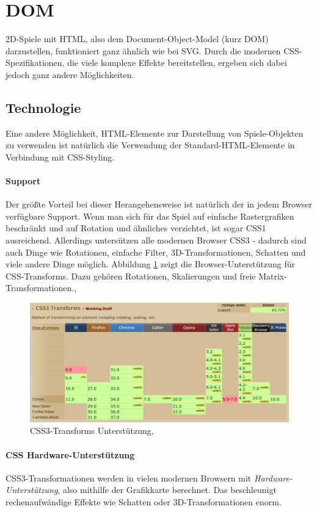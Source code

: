 \documentclass[a4paper, 12pt]{article}
\begin{document}
\section{DOM}
2D-Spiele mit HTML, also dem Document-Object-Model (kurz DOM) darzustellen, funktioniert ganz ähnlich wie bei SVG. Durch die modernen CSS-Spezifikationen, die viele komplexe Effekte bereitstellen, ergeben sich dabei jedoch ganz andere Möglichkeiten.
\subsection{Technologie}
Eine andere Möglichkeit, HTML-Elemente zur Darstellung von Spiele-Objekten zu verwenden ist natürlich die Verwendung der Standard-HTML-Elemente in Verbindung mit CSS-Styling.
\paragraph{Support} Der größte Vorteil bei dieser Herangehensweise ist natürlich der in jedem Browser verfügbare Support. Wenn man sich für das Spiel auf einfache Rastergrafiken beschränkt und auf Rotation und ähnliches verzichtet, ist sogar CSS1 ausreichend. Allerdings untersützen alle modernen Browser CSS3 - dadurch sind auch Dinge wie Rotationen, einfache Filter, 3D-Transformationen, Schatten und viele andere Dinge möglich. Abbildung \ref{css_transforms_support} zeigt die Browser-Unterstützung für CSS-Transforms. Dazu gehören Rotationen, Skalierungen und freie Matrix-Transformationen.\cite{CSS3_1},\cite{CSS3_2}
\begin{figure}[H]
	\begin{center}
		\includegraphics[width=\textwidth]{assets/css_transforms_support.png} 
	\end{center}
	\caption{CSS3-Transforms Unterstützung, \cite{CanIUseCSS3}}
	\label{css_transforms_support}
\end{figure}
\paragraph{CSS Hardware-Unterstützung} CSS3-Transformationen werden in vielen modernen Browsern mit \emph{Hardware-Unterstützung}, also mithilfe der Grafikkarte berechnet. Das beschleunigt rechenaufwändige Effekte wie Schatten oder 3D-Transformationen enorm.
\end{document}
